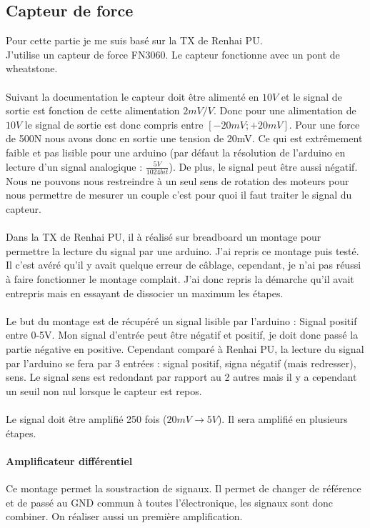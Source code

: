 \documentclass[11pt]{article}
\begin{document}
\subsection{Capteur de force}

Pour cette partie je me suis basé sur la TX de Renhai PU.\\
J'utilise un capteur de force FN3060. Le capteur fonctionne avec un pont de wheatstone. \\
\\
Suivant la documentation le capteur doit être alimenté en $10V$ et le signal de sortie est fonction de cette alimentation $2mV/V$. Donc pour une alimentation de $10V$ le signal de sortie est donc compris entre $ [-20mV ; +20mV] $. Pour une force de 500N nous avons donc en sortie une tension de 20mV. Ce qui est extrêmement faible et pas lisible pour une arduino (par défaut la résolution de l'arduino en lecture d'un signal analogique : $\frac{5V}{1024 bit} $). De plus, le signal peut être aussi négatif. Nous ne pouvons nous restreindre à un seul sens de rotation des moteurs pour nous permettre de mesurer un couple c'est pour quoi il faut traiter le signal du capteur.\\
\\
Dans la TX de Renhai PU, il à réalisé sur breadboard un montage pour permettre la lecture du signal par une arduino. J'ai repris ce montage puis testé. Il c'est avéré qu'il y avait quelque erreur de câblage, cependant, je n'ai pas réussi à faire fonctionner le montage complait. J'ai donc repris la démarche qu'il avait entrepris mais en essayant de dissocier un maximum les étapes.\\
\\
Le but du montage est de récupéré un signal lisible par l'arduino : Signal positif entre 0-5V. Mon signal d'entrée peut être négatif et positif, je doit donc passé la partie négative en positive. Cependant comparé à Renhai PU, la lecture du signal par l'arduino se fera par 3 entrées : signal positif, signa négatif (mais redresser), sens. Le signal sens est redondant par rapport au 2 autres mais il y a cependant un seuil non nul lorsque le capteur 	est repos.\\
\\
Le signal doit être amplifié 250 fois ($20mV \rightarrow 5V$). Il sera amplifié en plusieurs étapes. 

\paragraph{Amplificateur différentiel}
Ce montage permet la soustraction de signaux. Il permet de changer de référence et de passé au GND commun à toutes l'électronique, les signaux sont donc combiner. On réaliser aussi un première amplification.\\
\end{document}
